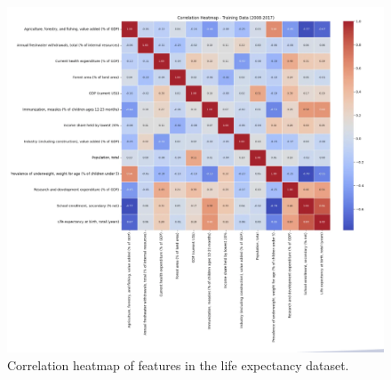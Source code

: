 \documentclass{article}
\begin{document}
\begin{figure}[h]
    \centering
    \includegraphics[width=0.8\columnwidth]{./pic/T1.a.2.png} %
    \caption{Correlation heatmap of features in the life expectancy dataset.}
    \label{fig:correlation_heatmap}
\end{figure}
\end{document}

